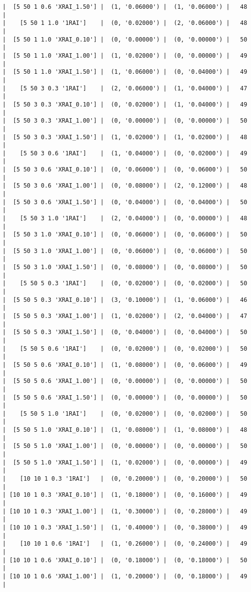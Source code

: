 \documentclass{article}
\begin{document}
\begin{verbatim}
|  [5 50 1 0.6 'XRAI_1.50'] |  (1, '0.06000') |  (1, '0.06000') |   48  |
|    [5 50 1 1.0 '1RAI']    |  (0, '0.02000') |  (2, '0.06000') |   48  |
|  [5 50 1 1.0 'XRAI_0.10'] |  (0, '0.00000') |  (0, '0.00000') |   50  |
|  [5 50 1 1.0 'XRAI_1.00'] |  (1, '0.02000') |  (0, '0.00000') |   49  |
|  [5 50 1 1.0 'XRAI_1.50'] |  (1, '0.06000') |  (0, '0.04000') |   49  |
|    [5 50 3 0.3 '1RAI']    |  (2, '0.06000') |  (1, '0.04000') |   47  |
|  [5 50 3 0.3 'XRAI_0.10'] |  (0, '0.02000') |  (1, '0.04000') |   49  |
|  [5 50 3 0.3 'XRAI_1.00'] |  (0, '0.00000') |  (0, '0.00000') |   50  |
|  [5 50 3 0.3 'XRAI_1.50'] |  (1, '0.02000') |  (1, '0.02000') |   48  |
|    [5 50 3 0.6 '1RAI']    |  (1, '0.04000') |  (0, '0.02000') |   49  |
|  [5 50 3 0.6 'XRAI_0.10'] |  (0, '0.06000') |  (0, '0.06000') |   50  |
|  [5 50 3 0.6 'XRAI_1.00'] |  (0, '0.08000') |  (2, '0.12000') |   48  |
|  [5 50 3 0.6 'XRAI_1.50'] |  (0, '0.04000') |  (0, '0.04000') |   50  |
|    [5 50 3 1.0 '1RAI']    |  (2, '0.04000') |  (0, '0.00000') |   48  |
|  [5 50 3 1.0 'XRAI_0.10'] |  (0, '0.06000') |  (0, '0.06000') |   50  |
|  [5 50 3 1.0 'XRAI_1.00'] |  (0, '0.06000') |  (0, '0.06000') |   50  |
|  [5 50 3 1.0 'XRAI_1.50'] |  (0, '0.08000') |  (0, '0.08000') |   50  |
|    [5 50 5 0.3 '1RAI']    |  (0, '0.02000') |  (0, '0.02000') |   50  |
|  [5 50 5 0.3 'XRAI_0.10'] |  (3, '0.10000') |  (1, '0.06000') |   46  |
|  [5 50 5 0.3 'XRAI_1.00'] |  (1, '0.02000') |  (2, '0.04000') |   47  |
|  [5 50 5 0.3 'XRAI_1.50'] |  (0, '0.04000') |  (0, '0.04000') |   50  |
|    [5 50 5 0.6 '1RAI']    |  (0, '0.02000') |  (0, '0.02000') |   50  |
|  [5 50 5 0.6 'XRAI_0.10'] |  (1, '0.08000') |  (0, '0.06000') |   49  |
|  [5 50 5 0.6 'XRAI_1.00'] |  (0, '0.00000') |  (0, '0.00000') |   50  |
|  [5 50 5 0.6 'XRAI_1.50'] |  (0, '0.00000') |  (0, '0.00000') |   50  |
|    [5 50 5 1.0 '1RAI']    |  (0, '0.02000') |  (0, '0.02000') |   50  |
|  [5 50 5 1.0 'XRAI_0.10'] |  (1, '0.08000') |  (1, '0.08000') |   48  |
|  [5 50 5 1.0 'XRAI_1.00'] |  (0, '0.00000') |  (0, '0.00000') |   50  |
|  [5 50 5 1.0 'XRAI_1.50'] |  (1, '0.02000') |  (0, '0.00000') |   49  |
|    [10 10 1 0.3 '1RAI']   |  (0, '0.20000') |  (0, '0.20000') |   50  |
| [10 10 1 0.3 'XRAI_0.10'] |  (1, '0.18000') |  (0, '0.16000') |   49  |
| [10 10 1 0.3 'XRAI_1.00'] |  (1, '0.30000') |  (0, '0.28000') |   49  |
| [10 10 1 0.3 'XRAI_1.50'] |  (1, '0.40000') |  (0, '0.38000') |   49  |
|    [10 10 1 0.6 '1RAI']   |  (1, '0.26000') |  (0, '0.24000') |   49  |
| [10 10 1 0.6 'XRAI_0.10'] |  (0, '0.18000') |  (0, '0.18000') |   50  |
| [10 10 1 0.6 'XRAI_1.00'] |  (1, '0.20000') |  (0, '0.18000') |   49  |

\end{verbatim}
\end{document}
